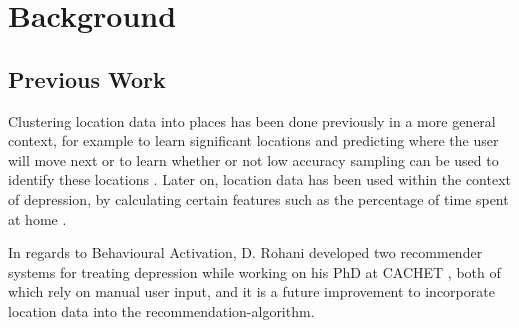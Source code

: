 \section{Background}



\subsection{Previous Work}
Clustering location data into places has been done previously in a more general context, for example to learn significant locations and predicting where the user will move next \cite{learning_significant_locations} or to learn whether or not low accuracy sampling can be used to identify these locations \cite{sparse-location-2014}. Later on, location data has been used within the context of depression, by calculating certain features such as the percentage of time spent at home \cite{Saeb2015, Canzian2015}. 

In regards to Behavioural Activation, D. Rohani developed two recommender systems for treating depression while working on his PhD at CACHET \cite{mubs-rohani, moribus}, both of which rely on manual user input, and it is a future improvement to incorporate location data into the recommendation-algorithm.






